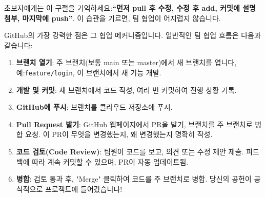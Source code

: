 초보자에게는 이 구절을 기억하세요:\textbf{“먼저 pull 후 수정, 수정 후 add, 커밋에 설명 첨부, 마지막에 push”}. 이 습관을 기르면, 팀 협업이 어지럽지 않습니다.


GitHub의 가장 강력한 점은 그 협업 메커니즘입니다. 일반적인 팀 협업 흐름은 다음과 같습니다:

\begin{enumerate}
  \item \textbf{브랜치 열기}: 주 브랜치(보통 main 또는 master)에서 새 브랜치를 엽니다, 예:\texttt{feature/\allowbreak login}, 이 브랜치에서 새 기능 개발.
  \item \textbf{개발 및 커밋}: 새 브랜치에서 코드 작성, 여러 번 커밋하여 진행 상황 기록.
  \item \textbf{GitHub에 푸시}: 브랜치를 클라우드 저장소에 푸시.
  \item \textbf{Pull Request 발기}: GitHub 웹페이지에서 PR을 발기, 브랜치를 주 브랜치로 병합 요청. 이 PR이 무엇을 변경했는지, 왜 변경했는지 명확히 작성.
  \item \textbf{코드 검토(Code Review)}: 팀원이 코드를 보고, 의견 또는 수정 제안 제출. 피드백에 따라 계속 커밋할 수 있으며, PR이 자동 업데이트됨.
  \item \textbf{병합}: 검토 통과 후, "Merge" 클릭하여 코드를 주 브랜치로 병합. 당신의 공헌이 공식적으로 프로젝트에 들어갔습니다!
\end{enumerate}


